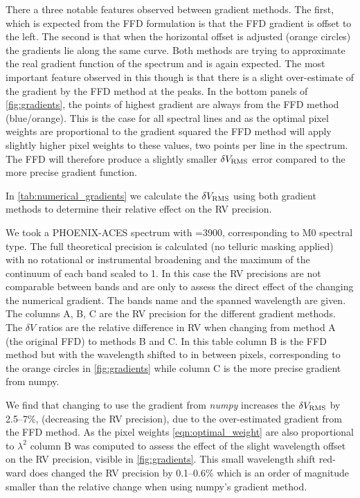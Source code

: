 There a three notable features observed between gradient methods.
The first, which is expected from the {FFD} formulation is that the {FFD} gradient is offset to the left.
The second is that when the horizontal offset is adjusted (orange circles) the gradients lie along the same curve.
Both methods are trying to approximate the real gradient function of the spectrum and is again expected.
The most important feature observed in this though is that there is a slight over-estimate of the gradient by the {FFD} method at the peaks.
In the bottom panels of \cref{fig:gradients}, the points of highest gradient are always from the {FFD} method (blue/orange).
This is the case for all spectral lines and as the optimal pixel weights are proportional to the gradient squared the {FFD} method will apply slightly higher pixel weights to these values, two points per line in the spectrum.
The {FFD} will therefore produce a slightly smaller \(\delta V_{\textrm{RMS}}\) error compared to the more precise gradient function.

In \cref{tab:numerical_gradients} we calculate the  \(\delta V_{\textrm{RMS}}\) using both gradient methods to determine their relative effect on the {RV} precision.

We took a {PHOENIX-ACES} spectrum with \Teff{}=3900\K{}, corresponding to {{M0}} spectral type.
The full theoretical precision is calculated (no telluric masking applied) with no rotational or instrumental broadening and the maximum of the continuum of each band scaled to 1.
In this case the {RV} precisions are not comparable between bands and are only to assess the direct effect of the changing the numerical gradient.
The bands name and the spanned wavelength are given.
The columns A, B, C are the {RV} precision for the different gradient methods.
The \(\delta V\) ratios are the relative difference in {RV} when changing from method A (the original {FFD}) to methods B and C.
In this table column B is the {FFD} method but with the wavelength shifted to in between pixels, corresponding to the orange circles in \cref{fig:gradients} while column C is the more precise gradient from numpy.

We find that changing to use the gradient from \emph{numpy} increases the \(\delta V_{\textrm{RMS}}\) by 2.5--7\%, (decreasing the {RV} precision), due to the over-estimated gradient from the {FFD} method.
As the pixel weights \cref{eqn:optimal_weight} are also proportional to \({\lambda}^{2}\) column B was computed to assess the effect of the slight wavelength offset on the {RV} precision, visible in \cref{fig:gradients}.
This small wavelength shift red-ward does changed the {RV} precision by 0.1--0.6\% which is an order of magnitude smaller than the relative change when using numpy's gradient method.

